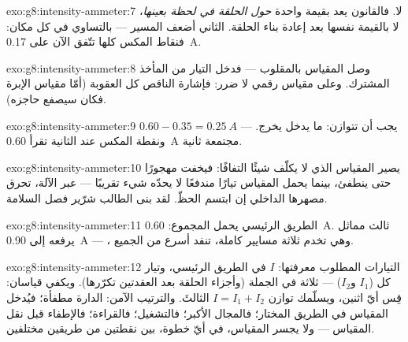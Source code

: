\begin{solution}{exo:g8:intensity-ammeter:7}
لا. فالقانون يعد بقيمة واحدة \emph{حول الحلقة في لحظة بعينها}،
لا بالقيمة نفسها بعد إعادة بناء الحلقة.  الثاني أضعف
المسير --- بالتساوي في كل مكان: فنقاط المكس كلها تتّفق الآن على
\qty{0.17}{A}.
\end{solution}

\begin{solution}{exo:g8:intensity-ammeter:8}
وصل المقياس بالمقلوب --- فدخل التيار من المأخذ المشترك. وعلى
مقياس رقمي لا ضرر: فإشارة الناقص كل العقوبة (أمّا مقياس الإبرة
فكان سيصفع حاجزه).
\end{solution}

\begin{solution}{exo:g8:intensity-ammeter:9}
$0.60 - 0.35 = \qty{0.25}{A}$ ---  يجب أن تتوازن: ما
يدخل يخرج. ونقطة المكس عند  الثانية تقرأ \qty{0.60}{A}
مجتمعة ثانية.
\end{solution}

\begin{solution}{exo:g8:intensity-ammeter:10}
 يصير المقياس الذي لا يكلّف شيئًا التفافًا: فيخفت
 مهجورًا حتى ينطفئ، بينما يحمل المقياس تيارًا مندفعًا لا
يحدّه شيء تقريبًا ---  عبر الآلة، تحرق مصهرها الداخلي
إن ابتسم الحظّ. لقد بنى الطالب شرّير فصل السلامة.
\end{solution}

\begin{solution}{exo:g8:intensity-ammeter:11}
الطريق الرئيسي يحمل المجموع: \qty{0.60}{A}.  ثالث مماثل
يرفعه إلى \qty{0.90}{A} --- ، وهي تخدم ثلاثة مسايير
كاملة، تنفد أسرع من الجميع.
\end{solution}

\begin{solution}{exo:g8:intensity-ammeter:12}
التيارات المطلوب معرفتها: $I$ في الطريق الرئيسي، وتيار كل 
($I_1$ و$I_2$) --- ثلاثة في الجملة (وأجزاء الحلقة بعد العقدتين
تكرّرها). ويكفي قياسان: قِس أيّ اثنين، ويسلّمك توازن 
$I = I_1 + I_2$ الثالثَ. والترتيب الآمن: الدارة مطفأة؛ فيُدخل
المقياس في الطريق المختار؛ فالمجال الأكبر؛ فالتشغيل؛ فالقراءة؛
فالإطفاء قبل نقل المقياس --- ولا يجسر المقياس، في أيّ خطوة،
بين نقطتين من طريقين مختلفين.
\end{solution}

